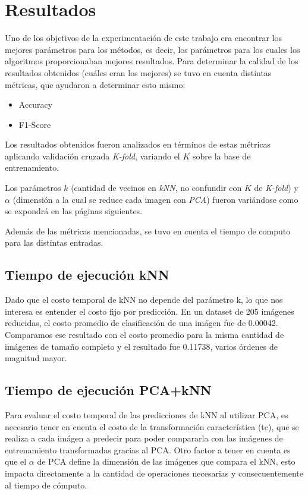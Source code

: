 \section{Resultados}

Uno de los objetivos de la experimentación de este trabajo era encontrar los mejores parámetros para los métodos, es decir, los parámetros para los cuales los algoritmos proporcionaban mejores resultados. Para determinar la calidad de los resultados obtenidos (cuáles eran los mejores) se tuvo en cuenta distintas métricas, que ayudaron a determinar esto mismo:

\begin{itemize}
\item Accuracy
\item F1-Score
\end{itemize}

Los resultados obtenidos fueron analizados en términos de estas métricas aplicando validación cruzada \textit{K-fold}, variando el $K$ sobre la base de entrenamiento.

Los parámetros $k$ (cantidad de vecinos en \textit{kNN}, no confundir con $K$ de \textit{K-fold}) y $\alpha$ (dimensión a la cual se reduce cada imagen con \textit{PCA}) fueron variándose como se expondrá en las páginas siguientes.

Además de las métricas mencionadas, se tuvo en cuenta el tiempo de computo para las distintas entradas.

\subsection{Tiempo de ejecución kNN}

Dado que el costo temporal de kNN no depende del parámetro k, lo que nos interesa es entender el costo fijo por predicción. En un dataset de 205 imágenes reducidas, el costo promedio de clasificación de una imágen fue de 0.00042. Comparamos ese resultado con el costo promedio para la misma cantidad de imágenes de tamaño completo y el resultado fue 0.11738, varios órdenes de magnitud mayor. 

\subsection{Tiempo de ejecución PCA+kNN}

Para evaluar el costo temporal de las predicciones de kNN al utilizar PCA, es necesario tener en cuenta el costo de la transformación característica (tc), que se realiza a cada imágen a predecir para poder compararla con las imágenes de entrenamiento transformadas gracias al PCA. Otro factor a tener en cuenta es que el $\alpha$ de PCA define la dimensión de las imágenes que compara el kNN, esto impacta directamente a la cantidad de operaciones necesarias y consecuentemente al tiempo de cómputo.

